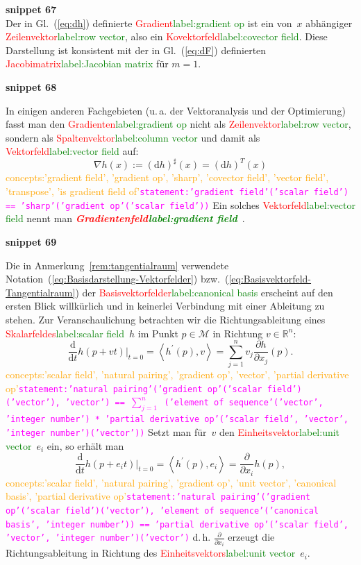 \documentclass[a4paper,twoside,english,ngerman,deutsch,german,sectrefs,envcountsame,envcountchap]{svmono}
\newcommand{\setref}[2]{\textcolor{red}{#1}\textcolor{green}{#2}}
\newcommand{\snippet}[1]{\textbf{snippet #1}\\}
\newcommand{\eqnote}[2]{\textcolor{orange}{#1}\textcolor{magenta}{\texttt{#2}}}
\begin{document}
\snippet{67}
Der in Gl.~(\ref{eq:dh}) definierte \setref{Gradient}{label:gradient op} ist ein
von~$x$ abhängiger \setref{Zeilenvektor}{label:row vector}, also ein \setref{Kovektorfeld}{label:covector field}. Diese Darstellung
ist konsistent mit der in Gl.~(\ref{eq:dF}) definierten \setref{Jacobimatrix}{label:Jacobian matrix}
für $m=1$.

\snippet{68}
\begin{remark}
[\setref{Gradientenfeld}{label:gradient field}]\label{rem:Gradient-als-Vektorfeld}In einigen anderen
Fachgebieten (u.\,a. der Vektoranalysis und der Optimierung) fasst
man den \setref{Gradienten}{label:gradient op} nicht als \setref{Zeilenvektor}{label:row vector}, sondern als \setref{Spaltenvektor}{label:column vector}
und damit als \setref{Vektorfeld}{label:vector field} auf:
\[
\nabla h(x):=({\mathrm{d}} h)^{\sharp}(x)=({\mathrm{d}} h)^{T}(x)
\]\eqnote{concepts:'gradient field', 'gradient op', 'sharp', 'covector field', 'vector field', 'transpose', 'is gradient field of'}{statement:'gradient field'('scalar field') == 'sharp'('gradient op'('scalar field'))}
Ein solches \setref{Vektorfeld}{label:vector field} nennt man \textbf{\em \setref{Gradientenfeld}{label:gradient field}}~\cite{koenigsberger2-2004,knauf2012}.
\end{remark}

\snippet{69}
\begin{remark}
[\setref{Notation der Basisvektorfelder}{label:canonical basis}]\label{rem:Notation-Basis-Vektorfelder}Die
in Anmerkung~\ref{rem:tangentialraum} verwendete Notation~(\ref{eq:Basisdarstellung-Vektorfelder})
bzw.~(\ref{eq:Basisvektorfeld-Tangentialraum}) der \setref{Basisvektorfelder}{label:canonical basis}
erscheint auf den ersten Blick willkürlich und in keinerlei Verbindung
mit einer Ableitung zu stehen. Zur Veranschaulichung betrachten wir
die Richtungsableitung eines \setref{Skalarfeldes}{label:scalar field}~$h$ im Punkt $p\in\mathcal{M}$
in Richtung $v\in{\mathbb{R}}^{n}$:
\[
\frac{{\mathrm{d}}}{{\mathrm{d}} t}\left.h(p+vt)\right|_{t=0}=\left\langle h^{\prime}(p),v\right\rangle =\sum_{j=1}^{n}v_{j}\frac{\partial h}{\partial x_{j}}(p).
\]\eqnote{concepts:'scalar field', 'natural pairing', 'gradient op', 'vector', 'partial derivative op'}{statement:'natural pairing'('gradient op'('scalar field')('vector'), 'vector') == $\sum_{j=1}^n$ ('element of sequence'('vector', 'integer number') * 'partial derivative op'('scalar field', 'vector', 'integer number')('vector'))}
Setzt man für~$v$ den \setref{Einheitsvektor}{label:unit vector}~$e_{i}$ ein, so erhält man
\[
\frac{{\mathrm{d}}}{{\mathrm{d}} t}\left.h(p+e_{i}t)\right|_{t=0}=\left\langle h^{\prime}(p),e_{i}\right\rangle =\frac{\partial}{\partial x_{i}}h(p),
\]\eqnote{concepts:'scalar field', 'natural pairing', 'gradient op', 'unit vector', 'canonical basis', 'partial derivative op'}{statement:'natural pairing'('gradient op'('scalar field')('vector'), 'element of sequence'('canonical basis', 'integer number')) == 'partial derivative op'('scalar field', 'vector', 'integer number')('vector')}
d.\,h. $\frac{\partial}{\partial x_{i}}$ erzeugt die Richtungsableitung
in Richtung des \setref{Einheitsvektors}{label:unit vector}~$e_{i}$.
\end{remark}
\end{document}
